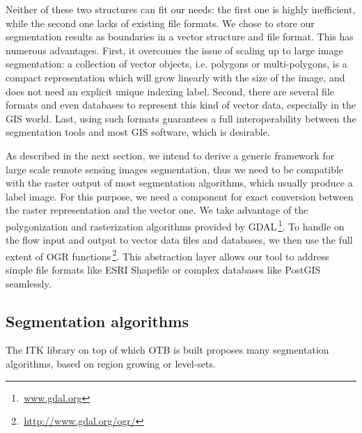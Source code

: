 \documentclass{josis}
\newcommand{\furl}[1]{$\,$\footnote{$\,$\url{#1}}}
\begin{document}
Neither of these two structures can fit our needs: the first one is
highly inefficient, while the second one lacks of existing file
formats. We chose to store our segmentation results as boundaries in a
vector structure and file format. This has numerous advantages. First,
it overcomes the issue of scaling up to large image segmentation: a
collection of vector objects, i.e. polygons or multi-polygons, is a
compact representation which will grow linearly with the size of the
image, and does not need an explicit unique indexing label. Second,
there are several file formats and even databases to represent this
kind of vector data, especially in the GIS world. Last, using such
formats guarantees a full interoperability between the segmentation
tools and most GIS software, which is desirable.

As described in the next section, we intend to derive a generic
framework for large scale remote sensing images segmentation, thus we
need to be compatible with the raster output of most segmentation
algorithms, which usually produce a label image. For this purpose, we
need a component for exact conversion between the raster
representation and the vector one. We take advantage of the
polygonization and rasterization algorithms provided by
GDAL\furl{www.gdal.org}. To handle on the flow input and output to vector data
files and databases, we then use the full extent of OGR
functions\furl{http://www.gdal.org/ogr/}. This abstraction layer allows our tool to address
simple file formats like ESRI Shapefile or complex databases like
PostGIS seamlessly.

\subsection{Segmentation algorithms}

The ITK library on top of which OTB is built proposes many segmentation algorithms, based on region growing or level-sets. 
\end{document}
